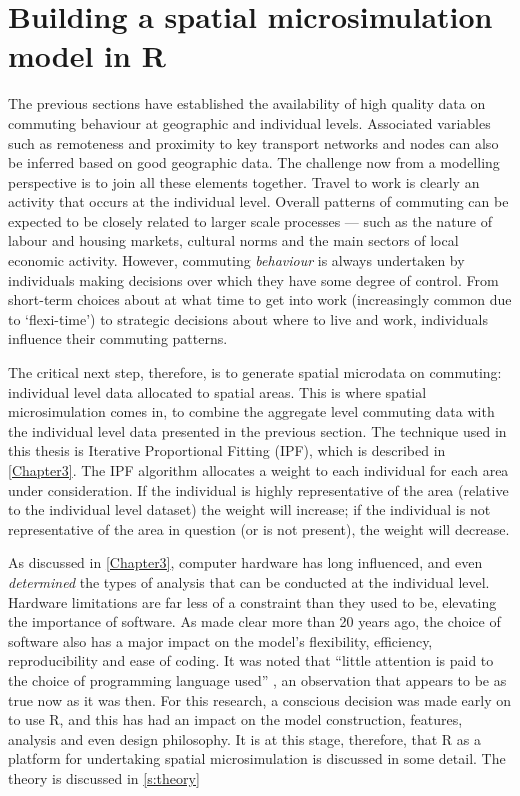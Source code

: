 
\section{Building a spatial microsimulation model in R} \label{setsim}
The previous sections have established the availability of high quality data
on commuting behaviour at geographic and individual levels. Associated
variables such as remoteness and proximity to key transport networks and nodes
can also be inferred based on good geographic data. The challenge now from a
modelling perspective is to join all these elements together.
Travel to work is
clearly an activity that occurs at the individual level. Overall patterns of
commuting can be expected to be closely related to larger scale processes ---
such as the nature of labour and housing markets, cultural norms and the main
sectors of local economic activity. However, commuting \emph{behaviour} is
always undertaken by individuals making decisions over which they have
some degree of control. %
From short-term choices about at what time to get into work (increasingly
common due to `flexi-time') to strategic decisions about where to live and
work, individuals influence their commuting patterns.

The critical next step, therefore, is to generate spatial microdata on
commuting: individual level data allocated to spatial areas. This is where
spatial microsimulation comes in, to combine the aggregate level commuting
data with the individual level data presented in the previous section.
The technique used in this thesis is Iterative Proportional Fitting (IPF), which
is described in \cref{Chapter3}. The IPF algorithm allocates a weight to each
individual for each area under consideration. If the individual is highly
representative of the area (relative to the individual level dataset) the
weight will increase; if the individual is not representative of the area in
question (or is not present), the weight will decrease.  

As discussed in \cref{Chapter3}, computer hardware has long influenced, and even
\emph{determined} the types of analysis that can be conducted at the individual
level. Hardware limitations are far less of a constraint than they used to be,
elevating the importance of software. As \citet{Holm1987} made clear more than
20 years ago,
the choice of software also
has a major impact on the model's flexibility, efficiency, reproducibility and
ease of coding. It was noted that ``little attention is paid to the
choice of programming language used'' \citep[p.~153]{Holm1987}, an observation
that appears to be as true now as it was then. %
For this research, a conscious decision was made early on to use R, and this
has had an impact on the model construction, features, analysis and even design
philosophy. It is at this stage, therefore, that R as a platform for undertaking
spatial microsimulation is discussed in some detail. The theory is discussed in
\cref{s:theory}

